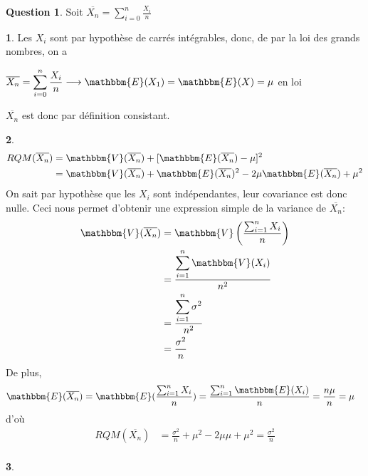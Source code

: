 \documentclass[12pt]{article}
\newcommand{\1}{\mathbbm{1}}
\newcommand{\E}{\mathbbm{E}}
\newcommand{\V}{\mathbbm{V}}
\newcommand{\Xn}{\overline{X_n}}
\theoremstyle{definition}\newtheorem{defn}{Définition}
\theoremstyle{definition}\newtheorem{exm}{Exemple}
\theoremstyle{definition}\newtheorem{rem}{Remarque}
\theoremstyle{definition}\newtheorem{algo}{Algorithme}
\theoremstyle{remark}\newtheorem{exo}{Exercice}
\theoremstyle{remark}\newtheorem{nota}{Notation}
\theoremstyle{definition}\newtheorem{1q}{Question}
\theoremstyle{definition}\newtheorem{2q}{Question}
\theoremstyle{definition}\newtheorem{3q}{Question}
\theoremstyle{definition}\newtheorem{4q}{Question}
\theoremstyle{definition}\newtheorem{2qs1}{}
\theoremstyle{definition}\newtheorem{2qs2}{}
\theoremstyle{definition}\newtheorem{2qs3}{}
\theoremstyle{definition}\newtheorem{2qs4}{}
\theoremstyle{definition}\newtheorem{4qs2}{}
\theoremstyle{definition}\newtheorem{4qs3}{}
\begin{document}
\begin{4q}
Soit $\Xn = \displaystyle\sum_{i=0}^n\frac{X_i}{n}$
\begin{4qs2}
Les $X_i$ sont par hypothèse de carrés intégrables, donc, de par la loi des grands nombres, on a
\begin{center}$\Xn =  \displaystyle\sum_{i=0}^n\frac{X_i}{n} \longrightarrow \E(X_1)=\E(X)=\mu$ en loi\end{center}
$\Xn$ est donc par définition consistant.
\end{4qs2}

\begin{4qs2}
\begin{align*}
RQM(\Xn) &=  \V(\Xn) + [\E(\Xn)-\mu]^2\\
&=  \V(\Xn) + \E(\Xn)^2 -2\mu\E(\Xn) + \mu^2\\
\end{align*}
On sait par hypothèse que les $X_i$ sont indépendantes, leur covariance est donc nulle. Ceci nous permet d'obtenir une expression simple de la variance de $\Xn$:
\begin{align*}
\V(\Xn)&=\displaystyle\V\left(\frac{\sum_{i=1}^n X_i}{n}\right)\\
&=\frac{\displaystyle\sum_{i=1}^n \V(X_i)}{n^2}\\
&=\frac{\displaystyle\sum_{i=1}^n \sigma^2}{n^2}\\ 
&=\frac{\sigma^2}{n}\\ 
\end{align*}
De plus, 
\begin{align*}
\E(\Xn) &= \E(\frac{\sum_{i=1}^n X_i}{n}) =\frac{\sum_{i=1}^n\E(X_i)}{n}= \frac{n\mu}{n} = \mu
\end{align*}
d'où
\begin{align*}
RQM(\Xn) &= \frac{\sigma^2}{n} + \mu^2 -2\mu\mu + \mu^2= \frac{\sigma^2}{n}\\
\end{align*}
\end{4qs2}

\begin{4qs2}


\end{4qs2}
\end{4q}
\end{document}
